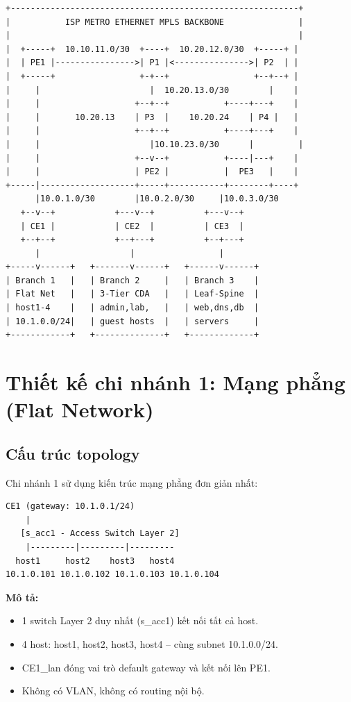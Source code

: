 \begin{Verbatim}[fontsize=\small, frame=single]
+----------------------------------------------------------+
|           ISP METRO ETHERNET MPLS BACKBONE               |
|                                                          |
|  +-----+  10.10.11.0/30  +----+  10.20.12.0/30  +-----+ |
|  | PE1 |---------------->| P1 |<--------------->| P2  | |
|  +-----+                 +-+--+                 +--+--+ |
|     |                      |  10.20.13.0/30        |    |
|     |                   +--+--+           +----+---+    |
|     |       10.20.13    | P3  |    10.20.24    | P4 |   |
|     |                   +--+--+           +----+---+    |
|     |                      |10.10.23.0/30      |         |
|     |                   +--v--+           +----|---+    |
|     |                   | PE2 |           |  PE3   |    |
+-----|-------------------+-----+-----------+--------+----+
      |10.0.1.0/30        |10.0.2.0/30     |10.0.3.0/30
   +--v--+            +---v--+          +---v--+
   | CE1 |            | CE2  |          | CE3  |
   +--+--+            +--+---+          +--+---+
      |                  |                 |
+-----v------+   +-------v------+   +------v------+
| Branch 1   |   | Branch 2     |   | Branch 3    |
| Flat Net   |   | 3-Tier CDA   |   | Leaf-Spine  |
| host1-4    |   | admin,lab,   |   | web,dns,db  |
| 10.1.0.0/24|   | guest hosts  |   | servers     |
+------------+   +--------------+   +-------------+
\end{Verbatim}



\section{Thiết kế chi nhánh 1: Mạng phẳng (Flat Network)}

\subsection{Cấu trúc topology}

Chi nhánh 1 sử dụng kiến trúc mạng phẳng đơn giản nhất:

\begin{Verbatim}[fontsize=\small, frame=single]
   CE1 (gateway: 10.1.0.1/24)
    |
   [s_acc1 - Access Switch Layer 2]
    |---------|---------|---------
  host1     host2    host3   host4
10.1.0.101 10.1.0.102 10.1.0.103 10.1.0.104
\end{Verbatim}

\textbf{Mô tả:}
\begin{itemize}
    \item 1 switch Layer 2 duy nhất (s\_acc1) kết nối tất cả host.
    \item 4 host: host1, host2, host3, host4 -- cùng subnet 10.1.0.0/24.
    \item CE1\_lan đóng vai trò default gateway và kết nối lên PE1.
    \item Không có VLAN, không có routing nội bộ.
\end{itemize}

